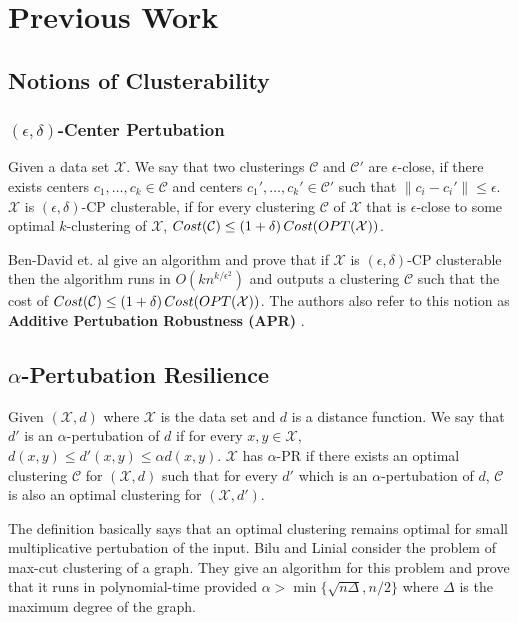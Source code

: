 \documentclass[11pt]{article}
\newcommand{\mc}{\mathcal}
\begin{document}
\section{Previous Work}
\subsection{Notions of Clusterability}

\subsubsection*{$(\epsilon, \delta)$-Center Pertubation \cite{ackerman2009clusterability}}
\begin{definition}
Given a data set $\mc X$. We say that two clusterings $\mc C$ and $\mc C'$ are $\epsilon$-close, if there exists centers $c_1,\ldots, c_k \in \mc C$ and centers $c_1',\ldots, c_k' \in \mc C'$ such that $\|c_i - c_i'\| \le \epsilon$. $\mc X$ is $(\epsilon, \delta)$-CP clusterable, if for every clustering $\mc C$ of $\mc X$ that is $\epsilon$-close to some optimal $k$-clustering of $\mc X$, $Cost(\mc C) \le (1 + \delta) \thinspace Cost(OPT(\mc X))$. 
\end{definition}
Ben-David et. al \cite{ackerman2009clusterability} give an algorithm and prove that if $\mc X$ is $(\epsilon, \delta)$-CP clusterable then the algorithm runs in $O(kn^{k/\epsilon^2})$ and outputs a clustering $\mc C$ such that the cost of $Cost(\mc C) \le (1+\delta)\thinspace Cost(OPT(\mc X))$. The authors also refer to this notion as \textbf{Additive Pertubation Robustness (APR)} \cite{ben2015computational}.  

\subsection*{$\alpha$-Pertubation Resilience \cite{bilu2012stable}}
\begin{definition}
Given $(\mc X, d)$ where $\mc X$ is the data set and $d$ is a distance function. We say that $d'$ is an $\alpha$-pertubation of $d$ if for every $x,y \in \mc X$, $d(x,y) \le d'(x,y) \le \alpha d(x,y)$. $\mc X$ has $\alpha$-PR if there exists an optimal clustering $\mc C$ for $(\mc X, d)$ such that for every $d'$ which is an $\alpha$-pertubation of $d$, $\mc C$ is also an optimal clustering for $(\mc X, d')$.
\end{definition}
The definition basically says that an optimal clustering remains optimal for small multiplicative pertubation of the input. Bilu and Linial \cite{bilu2012stable} consider the problem of max-cut clustering of a graph. They give an algorithm for this problem and prove that it runs in polynomial-time provided $\alpha > \min \{\sqrt{n\Delta}, n/2\}$ where $\Delta$ is the maximum degree of the graph.
\end{document}
